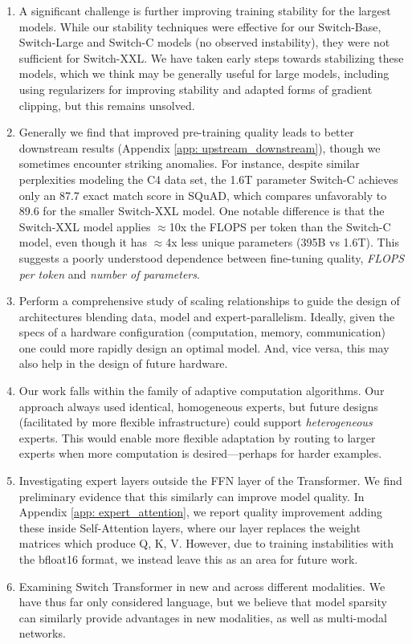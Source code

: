 \documentclass[twoside,11pt]{article}
\begin{document}
\begin{enumerate}
\item A significant challenge is further improving training stability for the largest models.
While our stability techniques were effective for our Switch-Base, Switch-Large and Switch-C models (no observed instability), they were not sufficient for Switch-XXL.
We have taken early steps towards stabilizing these models, which we think may be generally useful for large models, including using regularizers for improving stability and adapted forms of gradient clipping, but this remains unsolved.

\item Generally we find that improved pre-training quality leads to better downstream results (Appendix \ref{app: upstream_downstream}), though we sometimes encounter striking anomalies.
For instance, despite similar perplexities modeling the C4 data set, the 1.6T parameter Switch-C achieves only an 87.7 exact match score in SQuAD, which compares unfavorably to 89.6 for the smaller Switch-XXL model.
One notable difference is that the Switch-XXL model applies $\approx$10x the FLOPS per token than the Switch-C model, even though it has $\approx$4x less unique parameters (395B vs 1.6T).
This suggests a poorly understood dependence between fine-tuning quality, \emph{FLOPS per token} and \emph{number of parameters}.

\item Perform a comprehensive study of scaling relationships to guide the design of architectures blending data, model and expert-parallelism.
Ideally, given the specs of a hardware configuration (computation, memory, communication) one could more rapidly design an optimal model.
And, vice versa, this may also help in the design of future hardware.

\item Our work falls within the family of adaptive computation algorithms.
Our approach always used identical, homogeneous experts, but future designs (facilitated by more flexible infrastructure) could support \emph{heterogeneous} experts.
This would enable more flexible adaptation by routing to larger experts when more computation is desired---perhaps for harder examples.

\item Investigating expert layers outside the FFN layer of the Transformer.
We find preliminary evidence that this similarly can improve model quality.
In Appendix \ref{app: expert_attention}, we report quality improvement adding these inside Self-Attention layers, where our layer replaces the weight matrices which produce Q, K, V.
However, due to training instabilities with the bfloat16 format, we instead leave this as an area for future work.

\item Examining Switch Transformer in new and across different modalities. We have thus far only considered language, but we believe that model sparsity can similarly provide advantages in new modalities, as well as multi-modal networks.
\end{enumerate}
\end{document}
